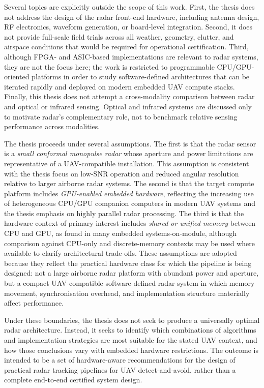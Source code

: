 Several topics are explicitly outside the scope of this work. First, the thesis does not address the design of the radar front-end hardware, including antenna design, RF electronics, waveform generation, or board-level integration. Second, it does not provide full-scale field trials across all weather, geometry, clutter, and airspace conditions that would be required for operational certification. Third, although FPGA- and ASIC-based implementations are relevant to radar systems, they are not the focus here; the work is restricted to programmable CPU/GPU-oriented platforms in order to study software-defined architectures that can be iterated rapidly and deployed on modern embedded UAV compute stacks. Finally, this thesis does not attempt a cross-modality comparison between radar and optical or infrared sensing. Optical and infrared systems are discussed only to motivate radar's complementary role, not to benchmark relative sensing performance across modalities. 

The thesis proceeds under several assumptions. The first is that the radar sensor is a \emph{small conformal monopulse radar} whose aperture and power limitations are representative of a UAV-compatible installation. This assumption is consistent with the thesis focus on low-SNR operation and reduced angular resolution relative to larger airborne radar systems. The second is that the target compute platform includes \emph{GPU-enabled embedded hardware}, reflecting the increasing use of heterogeneous CPU/GPU companion computers in modern UAV systems and the thesis emphasis on highly parallel radar processing. The third is that the hardware context of primary interest includes \emph{shared or unified memory} between CPU and GPU, as found in many embedded systems-on-module, although comparison against CPU-only and discrete-memory contexts may be used where available to clarify architectural trade-offs. These assumptions are adopted because they reflect the practical hardware class for which the pipeline is being designed: not a large airborne radar platform with abundant power and aperture, but a compact UAV-compatible software-defined radar system in which memory movement, synchronisation overhead, and implementation structure materially affect performance. 

Under these boundaries, the thesis does not seek to produce a universally optimal radar architecture. Instead, it seeks to identify which combinations of algorithms and implementation strategies are most suitable for the stated UAV context, and how those conclusions vary with embedded hardware restrictions. The outcome is intended to be a set of hardware-aware recommendations for the design of practical radar tracking pipelines for UAV detect-and-avoid, rather than a complete end-to-end certified system design. 